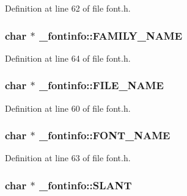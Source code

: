Definition at line 62 of file font.\-h.

\hypertarget{struct__fontinfo_a4af43750caadb3ae9d7375f0afdcd171}{
\subsubsection[{F\-A\-M\-I\-L\-Y\-\_\-\-N\-A\-M\-E}]{\setlength{\rightskip}{0pt plus 5cm}char $\ast$ \-\_\-fontinfo\-::\-F\-A\-M\-I\-L\-Y\-\_\-\-N\-A\-M\-E}}\label{struct__fontinfo_a4af43750caadb3ae9d7375f0afdcd171}


Definition at line 64 of file font.\-h.

\hypertarget{struct__fontinfo_a86ca02a864b7dccb21004f51bea22ed3}{
\subsubsection[{F\-I\-L\-E\-\_\-\-N\-A\-M\-E}]{\setlength{\rightskip}{0pt plus 5cm}char $\ast$ \-\_\-fontinfo\-::\-F\-I\-L\-E\-\_\-\-N\-A\-M\-E}}\label{struct__fontinfo_a86ca02a864b7dccb21004f51bea22ed3}


Definition at line 60 of file font.\-h.

\hypertarget{struct__fontinfo_a6c0f76f2668446a1c37ecab8d4e286a5}{
\subsubsection[{F\-O\-N\-T\-\_\-\-N\-A\-M\-E}]{\setlength{\rightskip}{0pt plus 5cm}char $\ast$ \-\_\-fontinfo\-::\-F\-O\-N\-T\-\_\-\-N\-A\-M\-E}}\label{struct__fontinfo_a6c0f76f2668446a1c37ecab8d4e286a5}


Definition at line 63 of file font.\-h.

\hypertarget{struct__fontinfo_aff56d18df3b46ec10896d15ad3a2e164}{
\subsubsection[{S\-L\-A\-N\-T}]{\setlength{\rightskip}{0pt plus 5cm}char $\ast$ \-\_\-fontinfo\-::\-S\-L\-A\-N\-T}}\label{struct__fontinfo_aff56d18df3b46ec10896d15ad3a2e164}


